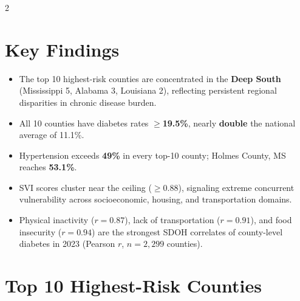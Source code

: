 \documentclass[10pt,letterpaper]{article}
\begin{document}
\begin{multicols}{2}
\vspace{2pt}

\section{Key Findings}

\begin{itemize}\setlength\itemsep{1pt}
  \item The top 10 highest-risk counties are concentrated in the \textbf{Deep
        South} (Mississippi 5, Alabama 3, Louisiana 2), reflecting
        persistent regional disparities in chronic disease burden.
  \item All 10 counties have diabetes rates \textbf{$\geq$19.5\%}, nearly
        \textbf{double} the national average of 11.1\%.
  \item Hypertension exceeds \textbf{49\%} in every top-10 county; Holmes County,
        MS reaches \textbf{53.1\%}.
  \item SVI scores cluster near the ceiling ($\geq$0.88), signaling extreme
        concurrent vulnerability across socioeconomic, housing, and
        transportation domains.
  \item Physical inactivity ($r = 0.87$), lack of transportation ($r = 0.91$),
        and food insecurity ($r = 0.94$) are the strongest SDOH correlates of
        county-level diabetes in 2023 (Pearson $r$, $n = 2{,}299$ counties).
\end{itemize}

\end{multicols}

\section{Top 10 Highest-Risk Counties}
\end{document}
